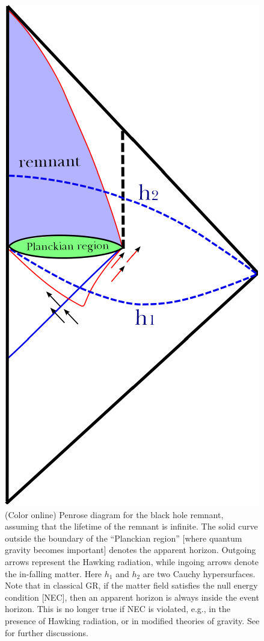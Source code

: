 \documentclass[12pt]{article}
\newcommand{\2}{$^2$}
\newcommand{\3}{$^3$}
\newcommand{\4}{$_4$}
\newcommand{\5}{$_5$}
\begin{document}
\begin{figure}
\begin{center}
\includegraphics[scale=1.00]{remnant-eps-converted-to.pdf}
\caption{\label{fig:remnant} (Color online) Penrose diagram for the black hole remnant, assuming that the lifetime of the remnant is infinite. The solid curve outside the boundary of the ``Planckian region'' [where quantum gravity becomes important] denotes the apparent horizon. Outgoing arrows represent the Hawking radiation, while ingoing arrows denote the in-falling matter. Here $h_1$ and $h_2$ are two Cauchy hypersurfaces. Note that in classical GR, if the matter field satisfies the null energy condition [NEC], then an apparent horizon is always inside the event horizon. This is no longer true if NEC is violated, e.g., in the presence of Hawking radiation, or in modified theories of gravity. See \cite{1309.4915} for further discussions.}
\end{center}
\end{figure}
\end{document}
